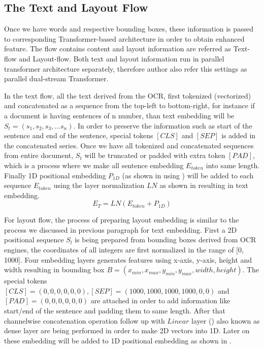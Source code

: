  

\subsection{The Text and Layout Flow}
Once we have words and respective bounding boxes, these information is passed to corresponding Transformer-based architecture in order to obtain enhanced feature. The flow contains content and layout information are referred as Text-flow and Layout-flow. Both text and layout information run in parallel transformer architecture separately, therefore author also refer this settings as parallel dual-stream Transformer.

In the text flow, all the text derived from the OCR, first tokenized (vectorized) and concatenated as a sequence from the top-left to bottom-right, for instance if a document is having sentences of n number, than text embedding will be \(S_t= (s_1, s_2, s_3,...s_n)\). In order to preserve the information such as start of the sentence and end of the sentence, special tokens $[CLS]$ and $[SEP]$ is added in the concatenated series. Once we have all tokenized and concatenated sequences from entire document, $S_t$ will be truncated or padded with extra token $[PAD]$, which is a process where we make all sentence embedding $E_{token}$  into same length. Finally 1D positional embedding $P_{1D}$ (as shown in  using ) will be added to each sequence $E_{token}$ using the layer normalization $LN$ as shown in  resulting in text embedding.
\begin{equation}
    E_T = LN(E_{token} + P_{1D})
    \label{eq:text_embedding}
\end{equation}

For layout flow, the process of preparing layout embedding is similar to the process we discussed in previous paragraph for text embedding. First a 2D positional sequence $S_l$ is being prepared from bounding boxes derived from OCR engines, the coordinates of all integers are first normalized in the range of [0, 1000]. Four embedding layers generates features using x-axis, y-axis, height and width resulting in bounding box \(B = (x_{min}, x_{max}, y_{min}, y_{max}, width, height)\). The special tokens $[CLS] = (0,0,0,0,0,0), [SEP] = (1000, 1000, 1000, 1000, 0, 0)$ and $[PAD] = (0,0,0,0,0,0)$ are attached in order to add information like start/end of the sentence and padding them to same length. After that channelwise concatenation operation follow up with  $Linear$ layer () also known as dense layer are being performed in order to make 2D vectors into 1D. Later on these embedding will be added to 1D positional embedding as shown in .

